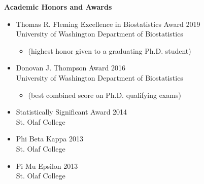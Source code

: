 \documentclass[margin]{res}
\begin{document}
\begin{resume}
\textbf{Academic Honors and Awards}
\begin{itemize} 
\item Thomas R. Fleming Excellence in Biostatistics Award \hfill 2019 \\   
University of Washington Department of Biostatistics
	\begin{itemize} \vspace{-0.2cm}
	\item[] 
	\begin{small}(highest honor given to a graduating Ph.D. student)\end{small}
	\end{itemize} \vspace{-0.1cm}
\item Donovan J. Thompson Award \hfill 2016 \\
University of Washington Department of Biostatistics 
	\begin{itemize} \vspace{-0.2cm}
	\item[] 
	\begin{small}(best combined score on Ph.D. qualifying exams) \end{small}
	\end{itemize} \vspace{-0.1cm}
\item Statistically Significant Award \hfill 2014 \\
St. Olaf College  
\item Phi Beta Kappa \hfill 2013 \\St. Olaf College 
\item Pi Mu Epsilon \hfill 2013 \\ St. Olaf College  \\
\end{itemize}



\end{resume}
\end{document}
